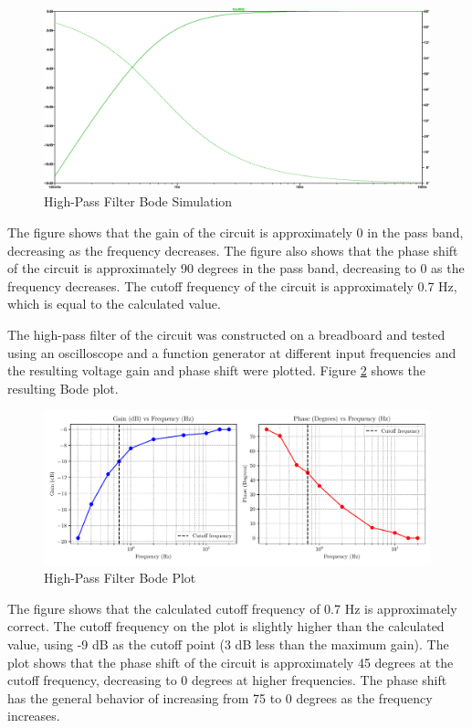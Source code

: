 \documentclass[CMPE]{KGCOEReport}
\begin{document}
\begin{figure}[H]
    \centering
    \includegraphics[width=1\textwidth]{SimFreqHighPass.png}
    \caption{High-Pass Filter Bode Simulation}
    \label{fig:highPassSim}
\end{figure}

The figure shows that the gain of the circuit is approximately 0 in the pass band, decreasing as the frequency decreases. The figure also shows that the phase shift of the circuit is approximately 90 degrees in the pass band, decreasing to 0 as the frequency decreases. The cutoff frequency of the circuit is approximately 0.7 Hz, which is equal to the calculated value.

The high-pass filter of the circuit was constructed on a breadboard and tested using an oscilloscope and a function generator at different input frequencies and the resulting voltage gain and phase shift were plotted. Figure \ref{fig:highPassBode} shows the resulting Bode plot.

\begin{figure}[H]
    \centering
    \includegraphics[width=1\textwidth]{high_pass_plot.pdf}
    \caption{High-Pass Filter Bode Plot}
    \label{fig:highPassBode}
\end{figure}

The figure shows that the calculated cutoff frequency of 0.7 Hz is approximately correct. The cutoff frequency on the plot is slightly higher than the calculated value, using -9 dB as the cutoff point (3 dB less than the maximum gain). The plot shows that the phase shift of the circuit is approximately 45 degrees at the cutoff frequency, decreasing to 0 degrees at higher frequencies. The phase shift has the general behavior of increasing from 75 to 0 degrees as the frequency increases.
\end{document}
